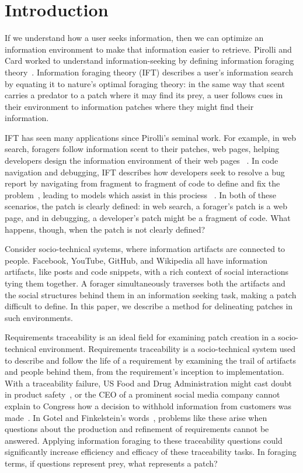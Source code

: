 \documentclass[conference]{IEEEtran}
\begin{document}
\section{Introduction}
If we understand how a user seeks information, then we can optimize an information environment to make that information easier to retrieve. Pirolli and Card worked to understand information-seeking by defining information foraging theory~\cite{ift,pirolli07}. Information foraging theory (IFT) describes a user's information search by equating it to nature's optimal foraging theory: in the same way that scent carries a predator to a patch where it may find its prey, a user follows cues in their environment to information patches where they might find their information.

IFT has seen many applications since Pirolli's seminal work. For example, in web search, foragers follow information scent to their patches, web pages, helping developers design the information environment of their web pages ~\cite{pirolliWeb,wufis,VLHCC2017}. In code navigation and debugging, IFT describes how developers seek to resolve a bug report by navigating from fragment to fragment of code to define and fix the problem~\cite{navValueCost}, leading to models which assist in this prociess ~\cite{pfisRevisit}. In both of these scenarios, the patch is clearly defined: in web search, a forager's patch is a web page, and in debugging, a developer's patch might be a fragment of code. What happens, though, when the patch is not clearly defined?

Consider socio-technical systems, where information artifacts are connected to people. Facebook, YouTube, GitHub, and Wikipedia all have information artifacts, like posts and code snippets, with a rich context of social interactions tying them together. A forager simultaneously traverses both the artifacts and the social structures behind them in an information seeking task, making a patch difficult to define. In this paper, we describe a method for delineating patches in such environments.

Requirements traceability is an ideal field for examining patch creation in a socio-technical environment. Requirements traceability is a socio-technical system used to describe and follow the life of a requirement by examining the trail of artifacts and people behind them, from the requirement's inception to implementation. With a traceability failure, US Food and Drug Administration might cast doubt in product safety~\cite{ICSE46}, or the CEO of a prominent social media company cannot explain to Congress how a decision to withhold information from customers was made~\cite{politicoFacebook}. In Gotel and Finkelstein's words~\cite{ICSE30}, problems like these arise when questions about the production and refinement of requirements cannot be answered. Applying information foraging to these traceability questions could significantly increase efficiency and efficacy of these traceability tasks. In foraging terms, if questions represent prey, what represents a patch? 
\end{document}
